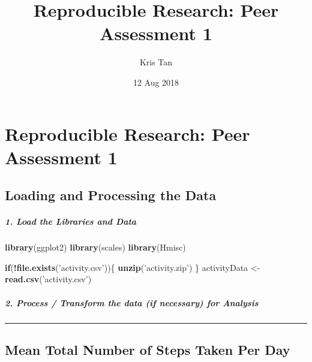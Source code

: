 \documentclass[]{article}
\title{Reproducible Research: Peer Assessment 1}
\author{Kris Tan}
\date{12 Aug 2018}
\newenvironment{Shaded}{\begin{snugshade}}{\end{snugshade}}
\newcommand{\KeywordTok}[1]{\textcolor[rgb]{0.13,0.29,0.53}{\textbf{#1}}}
\newcommand{\StringTok}[1]{\textcolor[rgb]{0.31,0.60,0.02}{#1}}
\newcommand{\CommentTok}[1]{\textcolor[rgb]{0.56,0.35,0.01}{\textit{#1}}}
\newcommand{\ControlFlowTok}[1]{\textcolor[rgb]{0.13,0.29,0.53}{\textbf{#1}}}
\newcommand{\OperatorTok}[1]{\textcolor[rgb]{0.81,0.36,0.00}{\textbf{#1}}}
\newcommand{\NormalTok}[1]{#1}
\let\oldsubparagraph\subparagraph
\renewcommand{\subparagraph}[1]{\oldsubparagraph{#1}\mbox{}}
\begin{document}
\maketitle

\section{Reproducible Research: Peer Assessment
1}\label{reproducible-research-peer-assessment-1}

\subsection{Loading and Processing the
Data}\label{loading-and-processing-the-data}

\subparagraph{1. Load the Libraries and
Data}\label{load-the-libraries-and-data}

\begin{Shaded}
\begin{Highlighting}[]
\KeywordTok{library}\NormalTok{(ggplot2)}
\KeywordTok{library}\NormalTok{(scales)}
\KeywordTok{library}\NormalTok{(Hmisc)}

\ControlFlowTok{if}\NormalTok{(}\OperatorTok{!}\KeywordTok{file.exists}\NormalTok{(}\StringTok{'activity.csv'}\NormalTok{))\{}
    \KeywordTok{unzip}\NormalTok{(}\StringTok{'activity.zip'}\NormalTok{)}
\NormalTok{\}}
\NormalTok{activityData <-}\StringTok{ }\KeywordTok{read.csv}\NormalTok{(}\StringTok{'activity.csv'}\NormalTok{)}
\end{Highlighting}
\end{Shaded}

\subparagraph{2. Process / Transform the data (if necessary) for
Analysis}\label{process-transform-the-data-if-necessary-for-analysis}

\begin{Shaded}
\end{Shaded}

\begin{center}\rule{0.5\linewidth}{\linethickness}\end{center}

\subsection{Mean Total Number of Steps Taken Per
Day}\label{mean-total-number-of-steps-taken-per-day}
\end{document}
